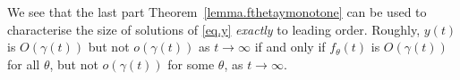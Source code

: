 \documentclass[a4paper,10pt,reqno]{amsart}
\numberwithin{equation}{section}
\newtheorem{lemma}{Lemma}
\theoremstyle{definition}
\theoremstyle{remark}
\DeclareMathOperator{\1}{\mathbbm 1}
\begin{document}
We see that the last part Theorem~\ref{lemma.fthetaymonotone} can be used to characterise the size of solutions of \eqref{eq.y} \textit{exactly} to leading order. Roughly, $y(t)$ is $O(\gamma(t))$ but not $o(\gamma(t))$ as $t\to\infty$ if and only if $f_\theta(t)$ is $O(\gamma(t))$ for all $\theta$, but not $o(\gamma(t))$ for some $\theta$, as $t\to\infty$. 
%
\end{document}
